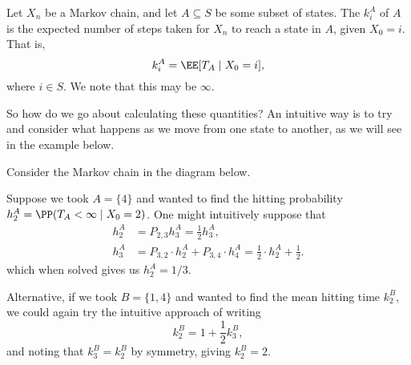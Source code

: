 \documentclass[a4paper]{scrartcl}
\begin{document}
\begin{definition}
	Let $X_n$ be a Markov chain, and let $A \subseteq S$ be some subset of states.
	The  $k^A_i$ of $A$ is the expected number of steps taken for $X_n$ to reach a state in $A$, given $X_0 = i$. That is,
	$$
	k^A_i = \EE[T_A \mid X_0 = i],
	$$
	where $i \in S$. We note that this may be $\infty$.
\end{definition}

So how do we go about calculating these quantities? An intuitive way is to try and consider what happens as we move from one state to another, as we will see in the example below.

\begin{example}
	Consider the Markov chain in the diagram below.
	\begin{center}
		\end{center}

		Suppose we took $A = \{4\}$ and wanted to find the hitting probability $h_2^A = \PP(T_A < \infty \mid X_0 = 2)$. One might intuitively suppose that
		\begin{align*}
			h_2^A &= P_{2, 3} h_3^A = \frac{1}{2} h_3^A, \\
			h_3^A &= P_{3, 2} \cdot h_2^A + P_{3, 4} \cdot h_4^A = \frac{1}{2} \cdot h_2^A + \frac{1}{2}.
		\end{align*}
		which when solved gives us $h_2^A = 1/3$.

		Alternative, if we took $B = \{1, 4\}$ and wanted to find the mean hitting time $k_2^B$, we could again try the intuitive approach of writing
		$$
		k_2^B = 1 + \frac{1}{2}k_3^B,
		$$
		and noting that $k_3^B = k_2^B$ by symmetry, giving $k_2^B = 2$.
\end{example}
\end{document}
